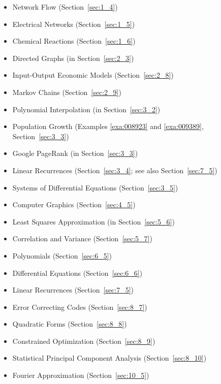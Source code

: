 \begin{itemize}
\item Network Flow (Section~\ref{sec:1_4})

\item Electrical Networks (Section~\ref{sec:1_5})

\item Chemical Reactions (Section~\ref{sec:1_6})

\item Directed Graphs (in Section~\ref{sec:2_3})

\item Input-Output Economic Models (Section~\ref{sec:2_8})

\item Markov Chains (Section~\ref{sec:2_9})

\item Polynomial Interpolation (in Section~\ref{sec:3_2})

\item Population Growth (Examples \ref{exa:008923} and \ref{exa:009389}, Section~\ref{sec:3_3})

\item Google PageRank (in Section~\ref{sec:3_3})

\item Linear Recurrences (Section~\ref{sec:3_4}; see also Section~\ref{sec:7_5})

\item Systems of Differential Equations (Section~\ref{sec:3_5})

\item Computer Graphics (Section~\ref{sec:4_5})

\item Least Squares Approximation (in Section~\ref{sec:5_6})

\item Correlation and Variance (Section~\ref{sec:5_7})

\item Polynomials (Section~\ref{sec:6_5})

\item Differential Equations (Section~\ref{sec:6_6})

\item Linear Recurrences (Section~\ref{sec:7_5})

\item Error Correcting Codes (Section~\ref{sec:8_7})

\item Quadratic Forms (Section~\ref{sec:8_8})

\item Constrained Optimization (Section~\ref{sec:8_9})

\item Statistical Principal Component Analysis (Section~\ref{sec:8_10})

\item Fourier Approximation (Section~\ref{sec:10_5})

\end{itemize}

